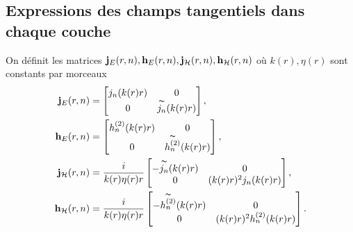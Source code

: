   \subsection{Expressions des champs tangentiels dans chaque couche}


    \begin{defn}
      \label{def:sphere:je-jH-hE-hH}
      On définit les matrices \(\mathbf{j}_{E}(r,n),\mathbf{h}_{E}(r,n),\mathbf{j}_{\mathcal{H}}(r,n),\mathbf{h}_{\mathcal{H}}(r,n)\) où \(k(r),\eta(r)\) sont constants par morceaux
      \begin{align*}
        \mathbf{j}_{E}(r,n) &=
        \begin{bmatrix}
            j_n(k(r)r) & 0
            \\
            0 & \overset{\thicksim}{j_n}(k(r)r)
        \end{bmatrix},
        \\
        \mathbf{h}_{E}(r,n) &=
        \begin{bmatrix}
            h^{(2)}_n(k(r)r) & 0
            \\
            0 & \overset{\thicksim}{h^{(2)}_n}(k(r)r)
        \end{bmatrix},
        \\
        \mathbf{j}_{\mathcal{H}}(r,n) &=\dfrac{i}{k(r)\eta(r)r}
        \begin{bmatrix}
                -\overset{\thicksim}{j_n}(k(r)r) & 0
                \\
                0 & (k(r)r)^2 j_n(k(r)r)
        \end{bmatrix},
        \\
        \mathbf{h}_{\mathcal{H}}(r,n) &=\dfrac{i}{k(r)\eta(r)r}
        \begin{bmatrix}
                -\overset{\thicksim}{h^{(2)}_n}(k(r)r) & 0
                \\
                0 & (k(r)r)^2 h^{(2)}_n(k(r)r)
        \end{bmatrix}.
      \end{align*}
    \end{defn}

